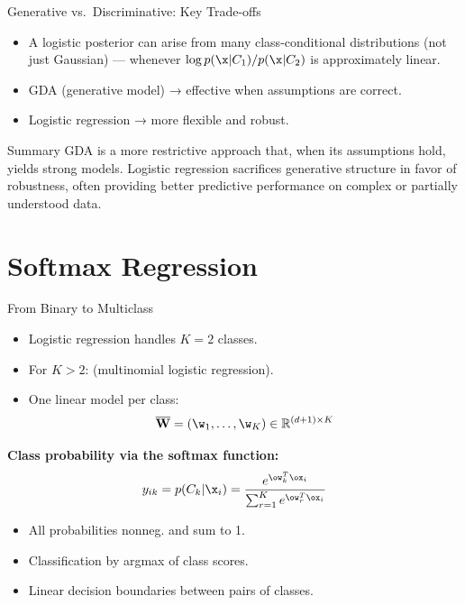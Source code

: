 \begin{frame}{Generative vs.\ Discriminative: Key Trade-offs}
  \begin{itemize}
    \item A logistic posterior can arise from many class-conditional distributions (not just Gaussian) — whenever $\log p(\x|C_1)/p(\x|C_2)$ is approximately linear.
    \item GDA  (generative model) → effective when assumptions are correct.
    \item Logistic regression  → more flexible and robust.
  \end{itemize}
  \vspace{0.3cm}
  \begin{block}{Summary}
    GDA is a more restrictive approach that, when its assumptions hold, yields strong models. Logistic regression sacrifices generative structure in favor of robustness, often providing better predictive performance on complex or partially understood data.
  \end{block}
\end{frame}

\section{Softmax Regression}

\begin{frame}{From Binary to Multiclass}
  \begin{itemize}
    \item Logistic regression handles $K=2$ classes.
    \item For $K > 2$:  (multinomial logistic regression).
    \item One linear model per class:
      \[
        \overline{\mathbf{W}} = (\w_1, \ldots, \w_K) \in \mathbb{R}^{(d+1)\times K}
      \]
  \end{itemize}
  \vspace{0.3cm}
  \textbf{Class probability via the softmax function:}
  \[
    y_{ik} = p(C_k|\x_i) = \frac{e^{\ow_k^T\ox_i}}{\sum_{r=1}^K e^{\ow_r^T\ox_i}}
  \]
  \begin{itemize}
    \item All probabilities nonneg. and sum to 1.
    \item Classification by argmax of class scores.
    \item Linear decision boundaries between pairs of classes.
  \end{itemize}
\end{frame}

